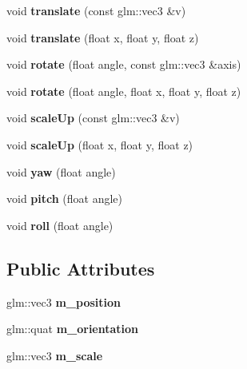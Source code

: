 \begin{DoxyCompactItemize}
\mbox{\label{class_transform_component_af6ff15b431e0959b26714037f4b5e5e9}} 
void {\bfseries translate} (const glm\+::vec3 \&v)
\item 
\mbox{\label{class_transform_component_af495b5a63ba61ac9f67170ecf30769ac}} 
void {\bfseries translate} (float x, float y, float z)
\item 
\mbox{\label{class_transform_component_a54f3f0e7924028bb32279aac3938a149}} 
void {\bfseries rotate} (float angle, const glm\+::vec3 \&axis)
\item 
\mbox{\label{class_transform_component_a7c97e7f1e9924b811319acb73accde72}} 
void {\bfseries rotate} (float angle, float x, float y, float z)
\item 
\mbox{\label{class_transform_component_a45483b2f5f38819ad0db6fcfe0f0ded8}} 
void {\bfseries scale\+Up} (const glm\+::vec3 \&v)
\item 
\mbox{\label{class_transform_component_a161374892f674b2e6d34bcaeb66a2a28}} 
void {\bfseries scale\+Up} (float x, float y, float z)
\item 
\mbox{\label{class_transform_component_ae32c6f3f18b81fc712629fb689d61252}} 
void {\bfseries yaw} (float angle)
\item 
\mbox{\label{class_transform_component_ad363ec339461bde470fcc50103d12ba7}} 
void {\bfseries pitch} (float angle)
\item 
\mbox{\label{class_transform_component_ae38356794f70a3838b7c690d3bb0bef7}} 
void {\bfseries roll} (float angle)
\end{DoxyCompactItemize}
\subsection*{Public Attributes}
\begin{DoxyCompactItemize}
\item 
\mbox{\label{class_transform_component_a5a441b52ff5f18d940e3351e35868481}} 
glm\+::vec3 {\bfseries m\+\_\+position}
\item 
\mbox{\label{class_transform_component_a70f27f66f621e0e52e96e40ec168ede2}} 
glm\+::quat {\bfseries m\+\_\+orientation}
\item 
\mbox{\label{class_transform_component_a50d168d6290b29a66b21ce576fa44d59}} 
glm\+::vec3 {\bfseries m\+\_\+scale}
\end{DoxyCompactItemize}


